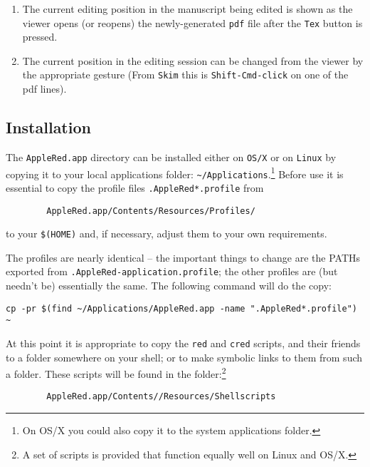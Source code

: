 \documentclass[11pt,a4paper]{article}
\begin{document}
\begin{enumerate}
\def\labelenumi{\arabic{enumi}.}
\item
  The current editing position in the manuscript being edited is shown
  as the viewer opens (or reopens) the newly-generated \texttt{pdf} file
  after the \texttt{Tex} button is pressed.
\item
  The current position in the editing session can be changed from the
  viewer by the appropriate gesture (From \texttt{Skim} this is
  \texttt{Shift-Cmd-click} on one of the pdf lines).
\end{enumerate}

\hypertarget{installation}{%
\subsection{Installation}\label{installation}}

The \texttt{AppleRed.app} directory can be installed either on
\texttt{OS/X} or on \texttt{Linux} by copying it to your local
applications folder: \texttt{\textasciitilde{}/Applications}.\footnote{On
OS/X you could also copy it to the system applications folder.}
Before use it is essential to copy the profile files \verb/.AppleRed*.profile/
from
\begin{verbatim}
        AppleRed.app/Contents/Resources/Profiles/
\end{verbatim}
to your \texttt{\$(HOME)} and, if necessary, adjust them to your
own requirements.

The profiles are nearly identical -- the important things to change are
the PATHs exported from \texttt{.AppleRed-application.profile}; the
other profiles are (but needn't be) essentially the same. The following
command will do the copy:

\begin{verbatim}
cp -pr $(find ~/Applications/AppleRed.app -name ".AppleRed*.profile") ~
\end{verbatim}

At this point it is appropriate   to copy the \texttt{red} and \texttt{cred} scripts, and
their friends to a folder somewhere on your shell; or to make symbolic links to them
from such a folder. These scripts will be found in the folder:\footnote{A set of scripts
is provided that function equally well on Linux and OS/X.}
\begin{verbatim}
        AppleRed.app/Contents//Resources/Shellscripts
\end{verbatim}
\end{document}
